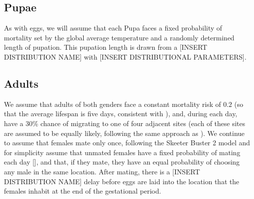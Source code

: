 \documentclass{article}
\begin{document}
\subsection{Pupae}
As with eggs, we will assume that each Pupa faces a fixed probability of mortality set by the global average temperature and a randomly determined length of pupation. This pupation length is drawn from a [INSERT DISTRIBUTION NAME] with [INSERT DISTRIBUTIONAL PARAMETERS].

\subsection{Adults}
We assume that adults of both genders face a constant mortality risk of $0.2$ (so that the average lifespan is five days, consistent with \cite{lambert2022meta}), and, during each day, have a 30\% chance of migrating to one of four adjacent sites (each of these sites are assumed to be equally likely, following the same approach as \cite{legros2016comparison}). We continue to assume that females mate only once, following the Skeeter Buster 2 model \cite{legros2016comparison} and for simplicity assume that unmated females have a fixed probability of mating each day [], and that, if they mate, they have an equal probability of choosing any male in the same location. After mating, there is a [INSERT DISTRIBUTION NAME] delay before eggs are laid into the location that the females inhabit at the end of the gestational period.


\end{document}
